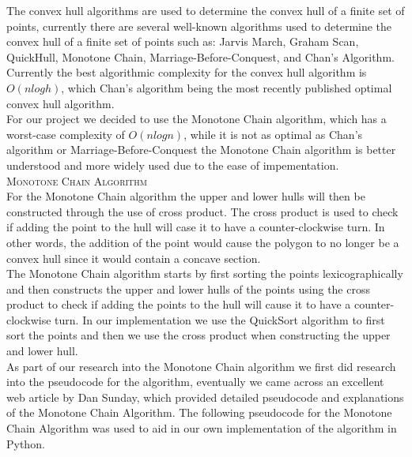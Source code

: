 \documentclass[pdftex,12pt,a4paper]{article}
\newcommand{\nspace}{\\[0.25cm]}
\newcommand{\Lspace}{\\[1.0cm]}
\begin{document}
The convex hull algorithms are used to determine the convex hull of a finite set of points,
currently there are several well-known algorithms used to determine the convex hull of a finite
set of points such as: Jarvis March, Graham Scan, QuickHull, Monotone Chain, Marriage-Before-Conquest, and Chan's Algorithm.  Currently the best algorithmic complexity for the convex hull algorithm is $O(n log h)$, which Chan's algorithm being the most recently published optimal  convex hull algorithm.\cite{chan1996optimal}\nspace


For our project we decided to use the Monotone Chain algorithm, which has a worst-case complexity
of $O(n log n)$, while it is not as optimal as Chan's algorithm or Marriage-Before-Conquest the Monotone Chain algorithm is better understood and more widely used due to the ease of impementation.\Lspace




\textsc{\Large Monotone Chain Algorithm} \hfill \nspace

For the Monotone Chain algorithm the upper and lower hulls will then be constructed through the use of cross product. The cross product is used to check if adding the point to the hull will case it to have a counter-clockwise turn. In other words, the addition of the point would cause the polygon to no longer be a convex hull since it would contain a concave section.\nspace

The Monotone Chain algorithm starts by first sorting the points lexicographically and then constructs the upper and lower hulls of the points using the cross product to check if adding the points to the hull will cause it to have a counter-clockwise turn. In our implementation we use the QuickSort algorithm to first sort the points and then we use the cross product when constructing the upper and lower hull.\nspace

As part of our research into the Monotone Chain algorithm we first did research into the
pseudocode for the algorithm, eventually we came across an excellent web article by Dan Sunday,
which provided detailed pseudocode and explanations of the Monotone Chain Algorithm.\cite{website:monotonechainweb} The following pseudocode for the Monotone Chain Algorithm was used to aid in our own implementation of the algorithm in Python.
\end{document}
